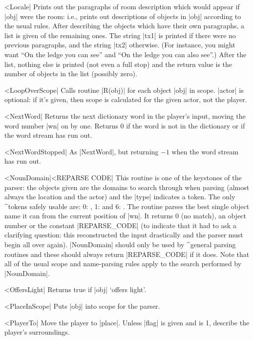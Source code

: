 {{{^^|Locale|
Prints out the paragraphs of room description which would appear
if |obj| were the room: i.e., prints out descriptions of objects
in |obj| according to the usual rules.  After describing the
objects which have their own paragraphs, a list is given of
the remaining ones.  The string |tx1| is printed if there were
no previous paragraphs, and the string |tx2| otherwise.
(For instance, you might want ``On the ledge you can see''
and ``On the ledge you can also see''.)  After the list, nothing
else is printed (not even a full stop) and the return value is
the number of objects in the list (possibly zero).

^^|LoopOverScope|
Calls routine |R(obj)| for each object |obj| in scope.  |actor|
is optional: if it's given, then scope is calculated for the
given actor, not the player.

^^|NextWord|
Returns the next dictionary word in the player's
input, moving the word number |wn| on by one.  Returns 0
if the word is not in the dictionary or if the word stream has
run out.

^^|NextWordStopped|
As |NextWord|, but returning $-1$ when the word stream has run out.

^^|NounDomain|^^|REPARSE CODE|
This routine is one of the keystones of the parser: the objects
given are the domains to search through when parsing (almost
always the location and the actor) and the |type| indicates a
token.  The only ^{tokens} safely usable are: 0: ,
1:  and 6: .  The routine parses
the best single object name it can from the current position
of |wn|.  It returns 0 (no match), an object number or
the constant |REPARSE_CODE| (to indicate that it had to ask
a clarifying question: this reconstructed the input drastically
and the parser must begin all over again).  |NounDomain| should
only be used by ^{general parsing routines} and these should
always return |REPARSE_CODE| if it does.  Note that all of the
usual scope and name-parsing rules apply to the search performed
by |NounDomain|.

^^|OffersLight|
Returns true if |obj| `offers light'.

^^|PlaceInScope|
Puts |obj| into scope for the parser.

^^|PlayerTo|
Move the player to |place|.  Unless
|flag| is given and is 1, describe the player's surroundings.

}}}
